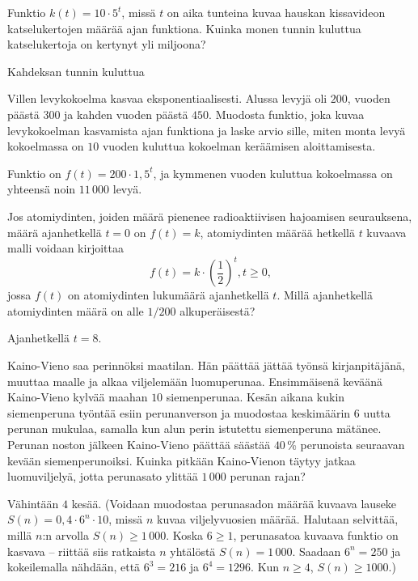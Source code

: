 \begin{tehtavasivu}
\begin{tehtava}
Funktio $k(t) = 10 \cdot 5^t$, missä $t$ on aika tunteina kuvaa hauskan kissavideon katselukertojen määrää ajan funktiona. Kuinka monen tunnin kuluttua katselukertoja on kertynyt yli miljoona?
\begin{vastaus}
Kahdeksan tunnin kuluttua
\end{vastaus}
\end{tehtava}

\begin{tehtava}
Villen levykokoelma kasvaa eksponentiaalisesti. Alussa levyjä oli $200$, vuoden päästä $300$ ja kahden vuoden päästä $450$. Muodosta funktio, joka kuvaa levykokoelman kasvamista ajan funktiona ja laske arvio sille, miten monta levyä kokoelmassa on $10$ vuoden kuluttua kokoelman keräämisen aloittamisesta.
\begin{vastaus}
Funktio on $f(t) = 200 \cdot 1,5^t$, ja kymmenen vuoden kuluttua kokoelmassa on yhteensä noin $11\,000$ levyä.
\end{vastaus}
\end{tehtava}

\begin{tehtava} %
Jos atomiydinten, joiden määrä pienenee radioaktiivisen hajoamisen seurauksena, määrä ajanhetkellä $t=0$ on $f(t)=k$, atomiydinten määrää hetkellä $t$ kuvaava malli voidaan kirjoittaa \[f(t) = k \cdot \left( \frac{1}{2} \right)^t, t \ge 0,\] jossa $f(t)$ on atomiydinten lukumäärä ajanhetkellä $t$. Millä ajanhetkellä atomiydinten määrä on alle $1/200$ alkuperäisestä?
\begin{vastaus}
Ajanhetkellä $t = 8$.
\end{vastaus}
\end{tehtava}

\begin{tehtava}
Kaino-Vieno saa perinnöksi maatilan. Hän päättää jättää työnsä kirjanpitäjänä, muuttaa maalle ja alkaa viljelemään luomuperunaa. Ensimmäisenä keväänä Kaino-Vieno kylvää maahan $10$ siemenperunaa. Kesän aikana kukin siemenperuna työntää esiin perunanverson ja muodostaa keskimäärin $6$ uutta perunan mukulaa, samalla kun alun perin istutettu siemenperuna mätänee. Perunan noston jälkeen Kaino-Vieno päättää säästää $40$\,\% perunoista seuraavan kevään siemenperunoiksi. Kuinka pitkään Kaino-Vienon täytyy jatkaa luomuviljelyä, jotta perunasato ylittää $1\,000$ perunan rajan? 
	\begin{vastaus}
	Vähintään $4$ kesää. (Voidaan muodostaa perunasadon määrää kuvaava lauseke $S(n)=0,4\cdot6^n\cdot10$, missä $n$ kuvaa viljelyvuosien määrää. Halutaan selvittää, millä $n$:n arvolla $S(n)\geq1\,000$. Koska $6\geq1$, perunasatoa kuvaava funktio on kasvava -- riittää siis ratkaista $n$ yhtälöstä $S(n)=1\,000$. Saadaan $6^n=250$ ja kokeilemalla nähdään, että $6^3=216$ ja $6^4=1296$. Kun $n\geq4$, $S(n)\geq1000$.)
	\end{vastaus}
\end{tehtava}


\end{tehtavasivu}

